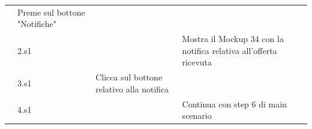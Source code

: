 \begin{longtable}{|C{3.0cm}|C{1.3cm}|L{5.2cm}|L{5.2cm}|}
                        & Preme sul bottone "Notifiche"
                        & \\
                        & 2.s1
                        & 
                        & Mostra il Mockup 34 con la notifica relativa all'offerta ricevuta\\
                        & 3.s1
                        & Clicca sul bottone relativo alla notifica
                        & \\
                        & 4.s1
                        &
                        & Continua con step 6 di main scenario\\
                \hline
            \end{longtable}